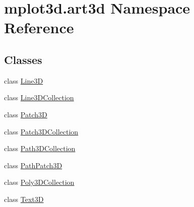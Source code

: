 \hypertarget{namespacemplot3d_1_1art3d}{}\section{mplot3d.\+art3d Namespace Reference}
\label{namespacemplot3d_1_1art3d}
\subsection*{Classes}
\begin{DoxyCompactItemize}
\item 
class \hyperlink{classmplot3d_1_1art3d_1_1Line3D}{Line3D}
\item 
class \hyperlink{classmplot3d_1_1art3d_1_1Line3DCollection}{Line3\+D\+Collection}
\item 
class \hyperlink{classmplot3d_1_1art3d_1_1Patch3D}{Patch3D}
\item 
class \hyperlink{classmplot3d_1_1art3d_1_1Patch3DCollection}{Patch3\+D\+Collection}
\item 
class \hyperlink{classmplot3d_1_1art3d_1_1Path3DCollection}{Path3\+D\+Collection}
\item 
class \hyperlink{classmplot3d_1_1art3d_1_1PathPatch3D}{Path\+Patch3D}
\item 
class \hyperlink{classmplot3d_1_1art3d_1_1Poly3DCollection}{Poly3\+D\+Collection}
\item 
class \hyperlink{classmplot3d_1_1art3d_1_1Text3D}{Text3D}
\end{DoxyCompactItemize}

